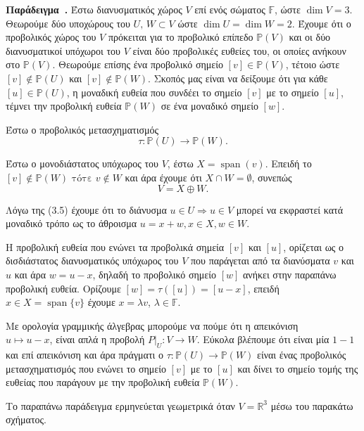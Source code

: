 \documentclass[12pt, a4paper]{book}
\newcounter{example}[section]
\newenvironment{example}[1][]{\refstepcounter{example}\par\medskip
   \textbf{Παράδειγμα~\theexample. #1} \rmfamily}{\medskip}
\DeclareMathOperator{\Span}{span}
\begin{document}
\begin{example}
Έστω διανυσματικός χώρος $V$ επί ενός σώματος $\mathbb{F}$, ώστε $\dim{V}=3$. Θεωρούμε δύο υποχώρους του $U,\,W \subset V$ ώστε $\dim{U} = \dim{W} = 2$. Έχουμε ότι ο προβολικός χώρος του $V$ πρόκειται για το προβολικό επίπεδο $\mathbb{P}(V)$ και οι δύο διανυσματικοί υπόχωροι του $V$ είναι δύο προβολικές ευθείες του, οι οποίες ανήκουν στο $\mathbb{P}(V)$. Θεωρούμε επίσης ένα προβολικό σημείο $[v]\in \mathbb{P}(V)$, τέτοιο ώστε $[v] \notin \mathbb{P}(U)$ και $[v] \notin \mathbb{P}(W)$. Σκοπός μας είναι να δείξουμε ότι για κάθε $[u] \in \mathbb{P}(U)$, η μοναδική ευθεία που συνδέει το σημείο $[v]$ με το σημείο $[u]$, τέμνει την προβολική ευθεία $\mathbb{P}(W)$ σε ένα μοναδικό σημείο $[w]$.

Έστω ο προβολικός μετασχηματισμός
\begin{displaymath}
τ: \mathbb{P}(U) \rightarrow \mathbb{P}(W).
\end{displaymath}

Έστω ο μονοδιάστατος υπόχωρος του $V$, έστω $X = \Span(v)$. Επειδή το $[v] \notin \mathbb{P}(W) \text{ τότε } v \notin W$ και άρα έχουμε ότι $X \cap W = \emptyset$, συνεπώς
\begin{equation}
V = X \oplus W.
\end{equation}

Λόγω της (3.5) έχουμε ότι το διάνυσμα $u \in U \Rightarrow u \in V$ μπορεί να εκφραστεί κατά μοναδικό τρόπο ως το άθροισμα $u = x + w, x \in X, w \in W$.

Η προβολική ευθεία που ενώνει τα προβολικά σημεία $[v]$ και $[u]$, ορίζεται ως ο δισδιάστατος διανυσματικός υπόχωρος του $V$ που παράγεται από τα διανύσματα $v$ και $u$ και άρα $w = u - x$, δηλαδή το προβολικό σημείο $[w]$ ανήκει στην παραπάνω προβολική ευθεία. Ορίζουμε $[w]=τ([u]) = [u-x]$, επειδή $x \in X = \Span\{v\}$ έχουμε $x = λv$, $λ \in \mathbb{F}$.

Με ορολογία γραμμικής άλγεβρας μπορούμε να πούμε ότι η απεικόνιση \\ $u \mapsto u - x$, είναι απλά η προβολή $P|_U : V \rightarrow W$. Εύκολα βλέπουμε ότι είναι μία $1-1$ και επί απεικόνιση  και άρα πράγματι ο $τ: \mathbb{P}(U) \rightarrow \mathbb{P}(W)$ είναι ένας προβολικός μετασχηματισμός που ενώνει το σημείο $[v]$ με το $[u]$ και δίνει το σημείο τομής της ευθείας που παράγουν με την προβολική ευθεία $\mathbb{P}(W)$. 
\end{example}

Το παραπάνω παράδειγμα ερμηνεύεται γεωμετρικά όταν $V = \mathbb{R}^3$ μέσω του παρακάτω σχήματος.
\end{document}
